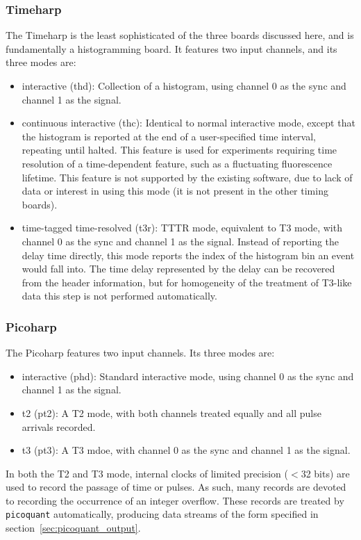 \documentclass{article}
\newcommand{\picoquant}{\texttt{picoquant}}
\begin{document}
\subsubsection{Timeharp}
The Timeharp is the least sophisticated of the three boards discussed here, and is fundamentally a histogramming board. It features two input channels, and its three modes are:
\begin{itemize}
\item interactive (thd): Collection of a histogram, using channel 0 as the sync and channel 1 as the signal.
\item continuous interactive (thc): Identical to normal interactive mode, except that the histogram is reported at the end of a user-specified time interval, repeating until halted. This feature is used for experiments requiring time resolution of a time-dependent feature, such as a fluctuating fluorescence lifetime. This feature is not supported by the existing software, due to lack of data or interest in using this mode (it is not present in the other timing boards).
\item time-tagged time-resolved (t3r): TTTR mode, equivalent to T3 mode, with channel 0 as the sync and channel 1 as the signal. Instead of reporting the delay time directly, this mode reports the index of the histogram bin an event would fall into. The time delay represented by the delay can be recovered from the header information, but for homogeneity of the treatment of T3-like data this step is not performed automatically.
\end{itemize}

\subsubsection{Picoharp}
The Picoharp features two input channels. Its three modes are:
\begin{itemize}
\item interactive (phd): Standard interactive mode, using channel 0 as the sync and channel 1 as the signal.
\item t2 (pt2): A T2 mode, with both channels treated equally and all pulse arrivals recorded. 
\item t3 (pt3): A T3 mdoe, with channel 0 as the sync and channel 1 as the signal.
\end{itemize}
In both the T2 and T3 mode, internal clocks of limited precision ($<$32 bits) are used to record the passage of time or pulses. As such, many records are devoted to recording the occurrence of an integer overflow. These records are treated by \picoquant{} automatically, producing data streams of the form specified in section~\ref{sec:picoquant_output}.
\end{document}
